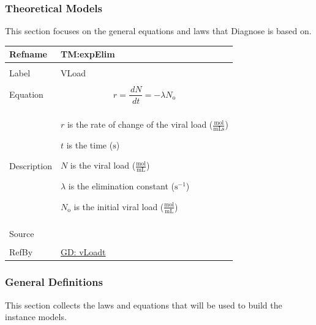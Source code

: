 \documentclass[12pt]{article}
\begin{document}
\subsubsection{Theoretical Models}
\label{Sec:TMs}
This section focuses on the general equations and laws that Diagnose is based on.

\vspace{\baselineskip}
\noindent
\begin{minipage}{\textwidth}
\begin{tabular}{>{\raggedright}p{}>{\raggedright\arraybackslash}p{}}
\toprule \textbf{Refname} & \textbf{TM:expElim}
\label{TM:expElim}
\\ \midrule \\
Label & VLoad
        
\\ \midrule \\
Equation & \begin{displaymath}
           r=\frac{\,dN}{\,dt}=-λ {N_{\text{o}}}
           \end{displaymath}
\\ \midrule \\
Description & \begin{symbDescription}
              \item{$r$ is the rate of change of the viral load ($\frac{\text{mol}}{\text{mL}\text{s}}$)}
              \item{$t$ is the time (${\text{s}}$)}
              \item{$N$ is the viral load ($\frac{\text{mol}}{\text{mL}}$)}
              \item{$λ$ is the elimination constant ($\text{s}^{-1}$)}
              \item{${N_{\text{o}}}$ is the initial viral load ($\frac{\text{mol}}{\text{mL}}$)}
              \end{symbDescription}
\\ \midrule \\
Source & \cite{libretexts2020}
         
\\ \midrule \\
RefBy & \hyperref[GD:vLoadt]{GD: vLoadt}
        
\\ \bottomrule
\end{tabular}
\end{minipage}
\subsubsection{General Definitions}
\label{Sec:GDs}
This section collects the laws and equations that will be used to build the instance models.
\end{document}
